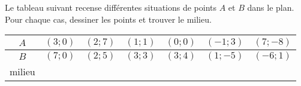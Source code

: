 
\begin{exercice}\label{exosmath-0021}

    Le tableau suivant recense différentes situations de points \( A\) et \( B\) dans le plan. Pour chaque cas, dessiner les points et trouver le milieu.

    \begin{center}
        \begin{tabular}[h]{|c||c|c|c|c|c|c|}
            \hline
            \( A\)&\( (3;0)\)&\( (2;7)\)&\( (1;1)\)&\( (0;0)\)&\( (-1;3)\)&\( (7;-8)\)\\
            \hline
            \( B\)&\( (7;0)\)&\( (2;5)\)&\( (3;3)\)&\( (3;4)\)&\( (1;-5)\)&\( (-6;1)\)\\
            \hline\hline
            milieu&&&&&&\\
            \hline
        \end{tabular}
    \end{center}

\end{exercice}
